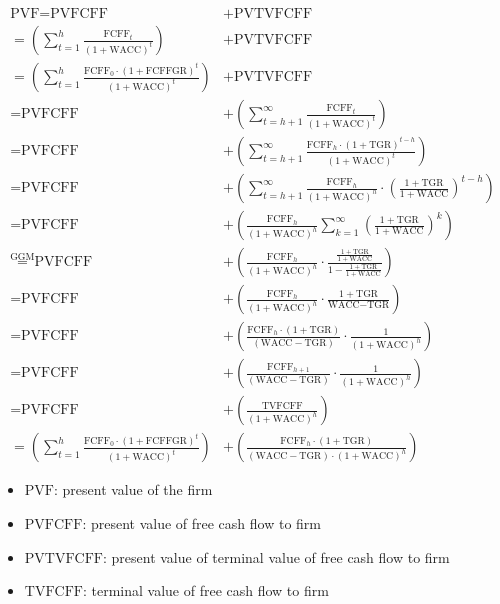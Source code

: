 $$
\begin{aligned}
\text{PVF} = \text{PVFCFF} &+ \text{PVTVFCFF} \\ 
= \left( \sum_{t=1}^{h} \frac{\text{FCFF}_t}{(1 + \text{WACC})^t} \right) &+ \text{PVTVFCFF} \\
= \left( \sum_{t=1}^{h} \frac{\text{FCFF}_0 \cdot (1+\text{FCFFGR})^t}{(1+\text{WACC})^t} \right) &+ \text{PVTVFCFF} \\
= \text{PVFCFF} &+ \left( \sum_{t=h+1}^{\infty} \frac{\text{FCFF}_t}{(1 + \text{WACC})^t} \right) \\
= \text{PVFCFF} &+ \left( \sum_{t=h+1}^{\infty} \frac{\text{FCFF}_h \cdot (1+\text{TGR})^{t-h}}{(1+\text{WACC})^t} \right) \\
= \text{PVFCFF} &+ \left( \sum_{t=h+1}^{\infty} \frac{\text{FCFF}_h}{(1+\text{WACC})^h} \cdot \left( \frac{1+\text{TGR}}{1+\text{WACC}} \right)^{t-h} \right) \\
= \text{PVFCFF} &+ \left( \frac{\text{FCFF}_h}{(1+\text{WACC})^h} \sum_{k=1}^{\infty} \left( \frac{1+\text{TGR}}{1+\text{WACC}} \right)^k \right) \\
\overset{\text{GGM}}{=} \text{PVFCFF} &+ \left( \frac{\text{FCFF}_h}{(1+\text{WACC})^h} \cdot \frac{\frac{1+\text{TGR}}{1+\text{WACC}}}{1 - \frac{1+\text{TGR}}{1+\text{WACC}}} \right) \\
= \text{PVFCFF} &+ \left( \frac{\text{FCFF}_h}{(1+\text{WACC})^h} \cdot \frac{1+\text{TGR}}{\text{WACC} - \text{TGR}} \right) \\
= \text{PVFCFF} &+ \left( \frac{\text{FCFF}_h \cdot (1+\text{TGR})}{(\text{WACC} - \text{TGR})} \cdot \frac{1}{(1+\text{WACC})^h} \right) \\ 
= \text{PVFCFF} &+ \left( \frac{\text{FCFF}_{h+1}}{(\text{WACC} - \text{TGR})} \cdot \frac{1}{(1 + \text{WACC})^h} \right) \\
= \text{PVFCFF} &+ \left( \frac{\text{TVFCFF}}{(1 + \text{WACC})^h} \right) \\ 
= \left( \sum_{t=1}^{h} \frac{\text{FCFF}_0 \cdot (1+\text{FCFFGR})^t}{(1+\text{WACC})^t} \right) &+ \left( \frac{\text{FCFF}_h \cdot (1+\text{TGR})}{(\text{WACC} - \text{TGR}) \cdot (1 + \text{WACC})^h} \right)
\end{aligned}
$$

\begin{itemize}
  \item[] $\text{PVF}$: present value of the firm
  \item[] $\text{PVFCFF}$: present value of free cash flow to firm
  \item[] $\text{PVTVFCFF}$: present value of terminal value of free cash flow to firm
  \item[] $\text{TVFCFF}$: terminal value of free cash flow to firm
\end{itemize}

